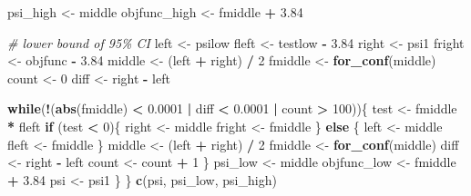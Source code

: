 \documentclass[
  10pt,
]{book}
\newenvironment{Shaded}{\begin{snugshade}}{\end{snugshade}}
\newcommand{\CommentTok}[1]{\textcolor[rgb]{0.56,0.35,0.01}{\textit{#1}}}
\newcommand{\ControlFlowTok}[1]{\textcolor[rgb]{0.13,0.29,0.53}{\textbf{#1}}}
\newcommand{\DecValTok}[1]{\textcolor[rgb]{0.00,0.00,0.81}{#1}}
\newcommand{\FloatTok}[1]{\textcolor[rgb]{0.00,0.00,0.81}{#1}}
\newcommand{\KeywordTok}[1]{\textcolor[rgb]{0.13,0.29,0.53}{\textbf{#1}}}
\newcommand{\NormalTok}[1]{#1}
\newcommand{\OperatorTok}[1]{\textcolor[rgb]{0.81,0.36,0.00}{\textbf{#1}}}
\newcommand{\StringTok}[1]{\textcolor[rgb]{0.31,0.60,0.02}{#1}}
\begin{document}
\begin{Shaded}
\begin{Highlighting}[]
\NormalTok{    psi\_high \textless{}{-}}\StringTok{ }\NormalTok{middle}
\NormalTok{    objfunc\_high \textless{}{-}}\StringTok{ }\NormalTok{fmiddle }\OperatorTok{+}\StringTok{ }\FloatTok{3.84}
    
    \CommentTok{\# lower bound of 95\% CI}
\NormalTok{    left \textless{}{-}}\StringTok{ }\NormalTok{psilow}
\NormalTok{    fleft \textless{}{-}}\StringTok{ }\NormalTok{testlow }\OperatorTok{{-}}\StringTok{ }\FloatTok{3.84}
\NormalTok{    right \textless{}{-}}\StringTok{ }\NormalTok{psi1}
\NormalTok{    fright \textless{}{-}}\StringTok{ }\NormalTok{objfunc }\OperatorTok{{-}}\StringTok{ }\FloatTok{3.84}
\NormalTok{    middle \textless{}{-}}\StringTok{ }\NormalTok{(left }\OperatorTok{+}\StringTok{ }\NormalTok{right) }\OperatorTok{/}\StringTok{ }\DecValTok{2}
\NormalTok{    fmiddle \textless{}{-}}\StringTok{ }\KeywordTok{for\_conf}\NormalTok{(middle)}
\NormalTok{    count \textless{}{-}}\StringTok{ }\DecValTok{0}
\NormalTok{    diff \textless{}{-}}\StringTok{ }\NormalTok{right }\OperatorTok{{-}}\StringTok{ }\NormalTok{left}
    
    \ControlFlowTok{while}\NormalTok{(}\OperatorTok{!}\NormalTok{(}\KeywordTok{abs}\NormalTok{(fmiddle) }\OperatorTok{\textless{}}\StringTok{ }\FloatTok{0.0001} \OperatorTok{|}\StringTok{ }\NormalTok{diff }\OperatorTok{\textless{}}\StringTok{ }\FloatTok{0.0001} \OperatorTok{|}\StringTok{ }\NormalTok{count }\OperatorTok{\textgreater{}}\StringTok{ }\DecValTok{100}\NormalTok{))\{}
\NormalTok{      test \textless{}{-}}\StringTok{ }\NormalTok{fmiddle }\OperatorTok{*}\StringTok{ }\NormalTok{fleft}
      \ControlFlowTok{if}\NormalTok{ (test }\OperatorTok{\textless{}}\StringTok{ }\DecValTok{0}\NormalTok{)\{}
\NormalTok{        right \textless{}{-}}\StringTok{ }\NormalTok{middle}
\NormalTok{        fright \textless{}{-}}\StringTok{ }\NormalTok{fmiddle}
\NormalTok{      \} }\ControlFlowTok{else}\NormalTok{ \{}
\NormalTok{        left \textless{}{-}}\StringTok{ }\NormalTok{middle}
\NormalTok{        fleft \textless{}{-}}\StringTok{ }\NormalTok{fmiddle}
\NormalTok{      \}}
\NormalTok{      middle \textless{}{-}}\StringTok{ }\NormalTok{(left }\OperatorTok{+}\StringTok{ }\NormalTok{right) }\OperatorTok{/}\StringTok{ }\DecValTok{2}
\NormalTok{      fmiddle \textless{}{-}}\StringTok{ }\KeywordTok{for\_conf}\NormalTok{(middle)}
\NormalTok{      diff \textless{}{-}}\StringTok{ }\NormalTok{right }\OperatorTok{{-}}\StringTok{ }\NormalTok{left}
\NormalTok{      count \textless{}{-}}\StringTok{ }\NormalTok{count }\OperatorTok{+}\StringTok{ }\DecValTok{1}
\NormalTok{    \}}
\NormalTok{    psi\_low \textless{}{-}}\StringTok{ }\NormalTok{middle}
\NormalTok{    objfunc\_low \textless{}{-}}\StringTok{ }\NormalTok{fmiddle }\OperatorTok{+}\StringTok{ }\FloatTok{3.84}
\NormalTok{    psi \textless{}{-}}\StringTok{ }\NormalTok{psi1}
\NormalTok{  \}}
\NormalTok{\}}
\KeywordTok{c}\NormalTok{(psi, psi\_low, psi\_high)}
\end{Highlighting}
\end{Shaded}
\end{document}

